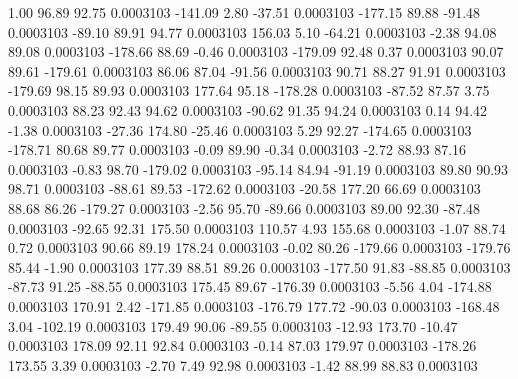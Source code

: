         1.00       96.89       92.75     0.0003103
     -141.09        2.80      -37.51     0.0003103
     -177.15       89.88      -91.48     0.0003103
      -89.10       89.91       94.77     0.0003103
      156.03        5.10      -64.21     0.0003103
       -2.38       94.08       89.08     0.0003103
     -178.66       88.69       -0.46     0.0003103
     -179.09       92.48        0.37     0.0003103
       90.07       89.61     -179.61     0.0003103
       86.06       87.04      -91.56     0.0003103
       90.71       88.27       91.91     0.0003103
     -179.69       98.15       89.93     0.0003103
      177.64       95.18     -178.28     0.0003103
      -87.52       87.57        3.75     0.0003103
       88.23       92.43       94.62     0.0003103
      -90.62       91.35       94.24     0.0003103
        0.14       94.42       -1.38     0.0003103
      -27.36      174.80      -25.46     0.0003103
        5.29       92.27     -174.65     0.0003103
     -178.71       80.68       89.77     0.0003103
       -0.09       89.90       -0.34     0.0003103
       -2.72       88.93       87.16     0.0003103
       -0.83       98.70     -179.02     0.0003103
      -95.14       84.94      -91.19     0.0003103
       89.80       90.93       98.71     0.0003103
      -88.61       89.53     -172.62     0.0003103
      -20.58      177.20       66.69     0.0003103
       88.68       86.26     -179.27     0.0003103
       -2.56       95.70      -89.66     0.0003103
       89.00       92.30      -87.48     0.0003103
      -92.65       92.31      175.50     0.0003103
      110.57        4.93      155.68     0.0003103
       -1.07       88.74        0.72     0.0003103
       90.66       89.19      178.24     0.0003103
       -0.02       80.26     -179.66     0.0003103
     -179.76       85.44       -1.90     0.0003103
      177.39       88.51       89.26     0.0003103
     -177.50       91.83      -88.85     0.0003103
      -87.73       91.25      -88.55     0.0003103
      175.45       89.67     -176.39     0.0003103
       -5.56        4.04     -174.88     0.0003103
      170.91        2.42     -171.85     0.0003103
     -176.79      177.72      -90.03     0.0003103
     -168.48        3.04     -102.19     0.0003103
      179.49       90.06      -89.55     0.0003103
      -12.93      173.70      -10.47     0.0003103
      178.09       92.11       92.84     0.0003103
       -0.14       87.03      179.97     0.0003103
     -178.26      173.55        3.39     0.0003103
       -2.70        7.49       92.98     0.0003103
       -1.42       88.99       88.83     0.0003103
